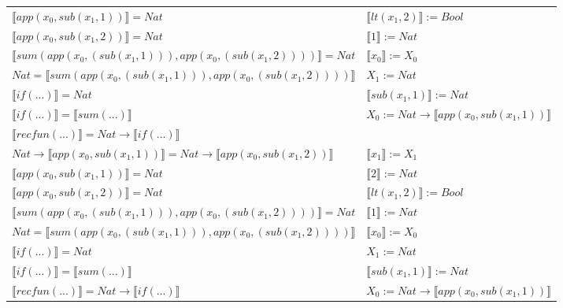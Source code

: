 \begin{exercise}
\begin{description}
\begin{center}
\begin{longtable}[!h]{ | l | l | }
                        $ \llbracket app(x_0, sub(x_1,1)) \rrbracket = Nat$ & $ \llbracket lt(x_1 , 2) \rrbracket := Bool$\\
                        $ \llbracket app(x_0, sub(x_1,2)) \rrbracket = Nat$ &  $ \llbracket 1 \rrbracket := Nat$\\
                        $ \llbracket sum(app(x_0, (sub(x_1,1))), app(x_0, (sub(x_1,2))))  \rrbracket = Nat$ & $ \llbracket x_0 \rrbracket := X_0$\\
                        $Nat =  \llbracket sum(app(x_0, (sub(x_1,1))), app(x_0, (sub(x_1,2)))) \rrbracket$ & $X_1 := Nat$\\
                        $ \llbracket if(...) \rrbracket = Nat$ &  $ \llbracket sub(x_1,1) \rrbracket := Nat$\\
                        $ \llbracket if(...) \rrbracket =  \llbracket sum(...) \rrbracket$ &  $X_0 := Nat \to  \llbracket app(x_0, sub(x_1,1)) \rrbracket$\\
                        $ \llbracket recfun(...) \rrbracket =   Nat  \to  \llbracket if(...) \rrbracket $ & \\
                    \hline
                        $Nat \to  \llbracket app(x_0, sub(x_1,1)) \rrbracket = Nat \to  \llbracket app(x_0, sub(x_1,2)) \rrbracket$ & $ \llbracket x_1 \rrbracket := X_1$\\
                        $ \llbracket app(x_0, sub(x_1,1)) \rrbracket = Nat$ & $ \llbracket 2 \rrbracket := Nat$\\
                        $ \llbracket app(x_0, sub(x_1,2)) \rrbracket = Nat$ & $ \llbracket lt(x_1 , 2) \rrbracket := Bool$\\
                        $ \llbracket sum(app(x_0, (sub(x_1,1))), app(x_0, (sub(x_1,2))))  \rrbracket = Nat$ &  $ \llbracket 1 \rrbracket := Nat$\\
                        $Nat =  \llbracket sum(app(x_0, (sub(x_1,1))), app(x_0, (sub(x_1,2)))) \rrbracket$ & $ \llbracket x_0 \rrbracket := X_0$\\
                        $ \llbracket if(...) \rrbracket = Nat$ & $X_1 := Nat$\\
                        $ \llbracket if(...) \rrbracket =  \llbracket sum(...) \rrbracket$ & $ \llbracket sub(x_1,1) \rrbracket := Nat$\\
                        $ \llbracket recfun(...) \rrbracket =   Nat  \to  \llbracket if(...) \rrbracket $& $X_0 := Nat \to  \llbracket app(x_0, sub(x_1,1)) \rrbracket$ \\

\end{longtable}
\end{center}
\end{description}
\end{exercise}
